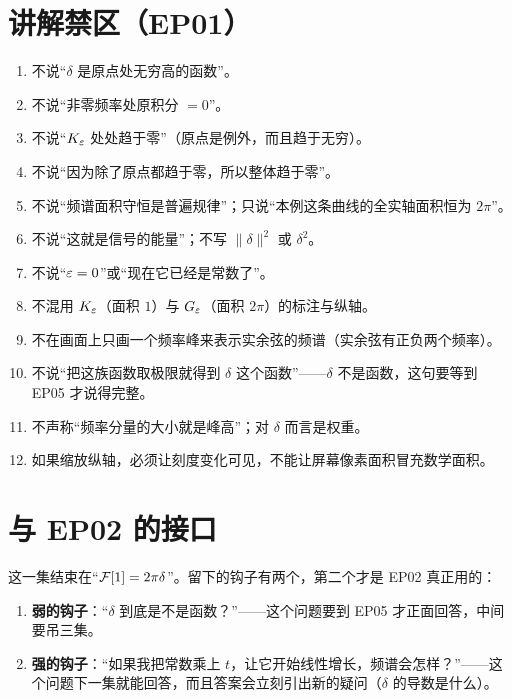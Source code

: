 \section{讲解禁区（EP01）}

\begin{warnbox}
\begin{enumerate}[leftmargin=1.6em,itemsep=0.28em]
\item 不说“$\delta$ 是原点处无穷高的函数”。
\item 不说“非零频率处原积分 $=0$”。
\item 不说“$K_\varepsilon$ 处处趋于零”（原点是例外，而且趋于无穷）。
\item 不说“因为除了原点都趋于零，所以整体趋于零”。
\item 不说“频谱面积守恒是普遍规律”；只说“本例这条曲线的全实轴面积恒为 $2\pi$”。
\item 不说“这就是信号的能量”；不写 $\|\delta\|^2$ 或 $\delta^2$。
\item 不说“$\varepsilon=0$”或“现在它已经是常数了”。
\item 不混用 $K_\varepsilon$（面积 $1$）与 $G_\varepsilon$（面积 $2\pi$）的标注与纵轴。
\item 不在画面上只画一个频率峰来表示实余弦的频谱（实余弦有正负两个频率）。
\item 不说“把这族函数取极限就得到 $\delta$ 这个函数”——$\delta$ 不是函数，这句要等到 EP05 才说得完整。
\item 不声称“频率分量的大小就是峰高”；对 $\delta$ 而言是权重。
\item 如果缩放纵轴，必须让刻度变化可见，不能让屏幕像素面积冒充数学面积。
\end{enumerate}
\end{warnbox}

\section{与 EP02 的接口}

这一集结束在“$\mathcal{F}[1]=2\pi\delta$”。留下的钩子有两个，第二个才是 EP02 真正用的：

\begin{enumerate}[leftmargin=2em,itemsep=0.45em]
\item \textbf{弱的钩子}：“$\delta$ 到底是不是函数？”——这个问题要到 EP05 才正面回答，中间要吊三集。
\item \textbf{强的钩子}：“如果我把常数乘上 $t$，让它开始线性增长，频谱会怎样？”——这个问题下一集就能回答，而且答案会立刻引出新的疑问（$\delta$ 的导数是什么）。
\end{enumerate}

